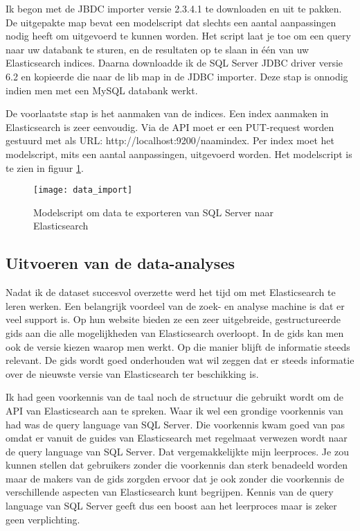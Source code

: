 Ik begon met de JBDC importer versie 2.3.4.1 te downloaden en uit te pakken. De uitgepakte map bevat een modelscript dat slechts een aantal aanpassingen nodig heeft om uitgevoerd te kunnen worden. Het script laat je toe om een query naar uw databank te sturen, en de resultaten op te slaan in één van uw Elasticsearch indices. Daarna downloadde ik de SQL Server JDBC driver versie 6.2 en kopieerde die naar de lib map in de JDBC importer. Deze stap is onnodig indien men met een MySQL databank werkt. 

De voorlaatste stap is het aanmaken van de indices. Een index aanmaken in Elasticsearch is zeer eenvoudig. Via de API moet er een PUT-request worden gestuurd met als URL: http://localhost:9200/naam\textunderscore index.
Per index moet het modelscript, mits een aantal aanpassingen, uitgevoerd worden. Het modelscript is te zien in figuur \ref{fig:data_import}.

\begin{figure}
	\centering
	\texttt{[image: data\_import]}
	\caption{Modelscript om data te exporteren van SQL Server naar Elasticsearch}
	\label{fig:data_import}
\end{figure}

\subsection{Uitvoeren van de data-analyses}
Nadat ik de dataset succesvol overzette werd het tijd om met Elasticsearch te leren werken. Een belangrijk voordeel van de zoek- en analyse machine is dat er veel support is. Op hun website bieden ze een zeer uitgebreide, gestructureerde gids aan die alle mogelijkheden van Elasticsearch overloopt. In de gids kan men ook de versie kiezen waarop men werkt. Op die manier blijft de informatie steeds relevant. De gids wordt goed onderhouden wat wil zeggen dat er steeds informatie over de nieuwste versie van Elasticsearch ter beschikking is. 

Ik had geen voorkennis van de taal noch de structuur die gebruikt wordt om de API van Elasticsearch aan te spreken. Waar ik wel een grondige voorkennis van had was de query language van SQL Server. Die voorkennis kwam goed van pas omdat er vanuit de guides van Elasticsearch met regelmaat verwezen wordt naar de query language van SQL Server. Dat vergemakkelijkte mijn leerproces. Je zou kunnen stellen dat gebruikers zonder die voorkennis dan sterk benadeeld worden maar de makers van de gids zorgden ervoor dat je ook zonder die voorkennis de verschillende aspecten van Elasticsearch kunt begrijpen. Kennis van de query language van SQL Server geeft dus een boost aan het leerproces maar is zeker geen verplichting.

